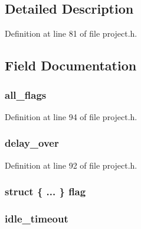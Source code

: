 \subsection{\-Detailed \-Description}


\-Definition at line 81 of file project.\-h.



\subsection{\-Field \-Documentation}
\hypertarget{unions__system__flags_abf876e68df8575f02084e137cc49266b}{
\subsubsection[{all\-\_\-flags}]{ {\bf all\-\_\-flags}}}\label{unions__system__flags_abf876e68df8575f02084e137cc49266b}


\-Definition at line 94 of file project.\-h.

\hypertarget{unions__system__flags_ad5b983b8993f0c84c55acdf27ba1b970}{
\subsubsection[{delay\-\_\-over}]{ {\bf delay\-\_\-over}}}\label{unions__system__flags_ad5b983b8993f0c84c55acdf27ba1b970}


\-Definition at line 92 of file project.\-h.

\hypertarget{unions__system__flags_af304308f8c7e41fd32adb2085357b6ae}{
\subsubsection[{flag}]{\setlength{\rightskip}{0pt plus 5cm}struct \{ ... \}   {\bf flag}}}\label{unions__system__flags_af304308f8c7e41fd32adb2085357b6ae}
\hypertarget{unions__system__flags_a819736792984a6a50bc4ffb12a07b985}{
\subsubsection[{idle\-\_\-timeout}]{ {\bf idle\-\_\-timeout}}}\label{unions__system__flags_a819736792984a6a50bc4ffb12a07b985}



